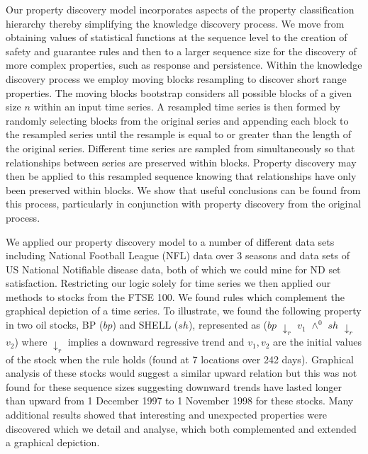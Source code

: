 \medskip


Our property discovery model incorporates aspects of the property
classification hierarchy thereby simplifying the knowledge discovery
process. We move from obtaining values of statistical functions at the
sequence level to the creation of safety and guarantee rules and then
to a larger sequence size for the discovery of more complex
properties, such as response and persistence.
Within the knowledge discovery process we employ moving blocks
resampling to discover short range properties. The moving blocks
bootstrap considers all possible blocks of a given size $n$ within an
input time series. A resampled time series is then formed by randomly
selecting blocks from the original series and appending each block to
the resampled series until the resample is equal to or greater than
the length of the original series.  Different time series are sampled
from simultaneously so that relationships between series are preserved
within blocks. Property discovery may then be
applied to this resampled sequence knowing that relationships have
only been preserved within blocks. We show that useful conclusions can
be found from this process, particularly in conjunction with property
discovery from the original process.

\medskip

We applied our property discovery model to a number of different data
sets including National Football League (NFL) data over 3 seasons and data
sets of US National Notifiable disease data, both of which we could
mine for ND set satisfaction. Restricting our logic solely for time
series we then applied our methods to stocks from the FTSE 100. We found
rules which complement the graphical depiction of a time series. To
illustrate, we found the following property in two oil stocks, BP ($bp$) and
SHELL ($sh$), represented as  ($bp$ $\downarrow_r$ $v_1$
$\wedge^0$ $sh$ $\downarrow_r$ $v_2$) where $\downarrow_r$ implies a downward
regressive trend and $v_1,v_2$ are the initial values of the stock
when the rule holds (found at 7 locations over 242 days).  Graphical analysis of these stocks would suggest
a similar upward relation but this was not found for these sequence
sizes suggesting downward trends have lasted longer than upward from 1
December 1997 to 1 November 1998 for these stocks. Many additional results 
showed that interesting and unexpected properties were
discovered which we detail and analyse, which both complemented and
extended a graphical depiction.

\medskip

